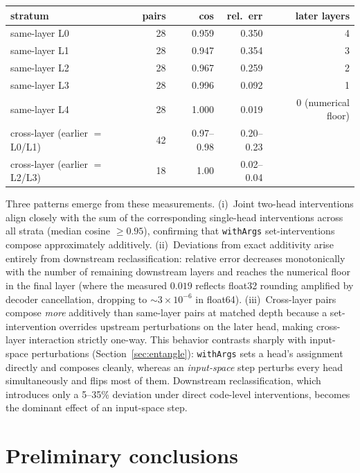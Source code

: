 \begin{center}
\begin{tabular}{@{}lrrrr@{}}
\toprule
stratum & pairs & cos & rel.\ err & later layers \\
\midrule
same-layer L0 & 28 & 0.959 & 0.350 & 4 \\
same-layer L1 & 28 & 0.947 & 0.354 & 3 \\
same-layer L2 & 28 & 0.967 & 0.259 & 2 \\
same-layer L3 & 28 & 0.996 & 0.092 & 1 \\
same-layer L4 & 28 & 1.000 & 0.019 & 0 (numerical floor) \\
cross-layer (earlier $=$ L0/L1) & 42 & 0.97--0.98 & 0.20--0.23 & \\
cross-layer (earlier $=$ L2/L3) & 18 & 1.00 & 0.02--0.04 & \\
\bottomrule
\end{tabular}
\end{center}

Three patterns emerge from these measurements. (i)~Joint two-head
interventions align closely with the sum of the corresponding single-head
interventions across all strata (median cosine $\ge 0.95$), confirming
that \texttt{withArgs} set-interventions compose approximately
additively. (ii)~Deviations from exact additivity arise entirely from
downstream reclassification: relative error decreases monotonically with
the number of remaining downstream layers and reaches the numerical floor
in the final layer (where the measured $0.019$ reflects float32 rounding
amplified by decoder cancellation, dropping to ${\sim}3{\times}10^{-6}$
in float64). (iii)~Cross-layer pairs compose \emph{more} additively than
same-layer pairs at matched depth because a set-intervention overrides
upstream perturbations on the later head, making cross-layer interaction
strictly one-way. This behavior contrasts sharply with input-space
perturbations (Section~\ref{sec:entangle}): \texttt{withArgs} sets a
head's assignment directly and composes cleanly, whereas an
\emph{input-space} step perturbs every head simultaneously and flips most
of them. Downstream reclassification, which introduces only a 5--35\%
deviation under direct code-level interventions, becomes the dominant
effect of an input-space step.

\section{Preliminary conclusions}

